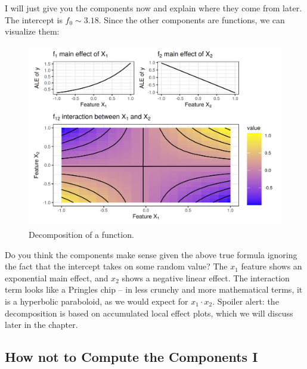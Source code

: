 \documentclass[12pt,]{krantz}
\begin{document}
I will just give you the components now and explain where they come from
later. The intercept is \(f_0\sim3.18\). Since the other components are
functions, we can visualize them:

\begin{figure}

{\centering \includegraphics[width=\textwidth]{images/unnamed-chunk-17-1} 

}

\caption{Decomposition of a function.}\label{fig:unnamed-chunk-17}
\end{figure}

Do you think the components make sense given the above true formula
ignoring the fact that the intercept takes on some random value? The
\(x_1\) feature shows an exponential main effect, and \(x_2\) shows a
negative linear effect. The interaction term looks like a Pringles chip
-- in less crunchy and more mathematical terms, it is a hyperbolic
paraboloid, as we would expect for \(x_1 \cdot x_2\). Spoiler alert: the
decomposition is based on accumulated local effect plots, which we will
discuss later in the chapter.

\subsection{How not to Compute the Components
I}\label{how-not-to-compute-the-components-i}
\end{document}
